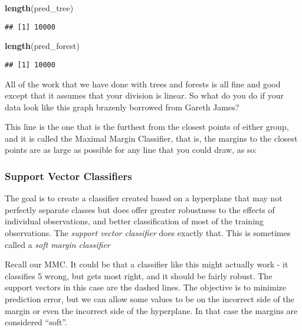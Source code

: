 \documentclass[]{article}
\newenvironment{Shaded}{\begin{snugshade}}{\end{snugshade}}
\newcommand{\KeywordTok}[1]{\textcolor[rgb]{0.13,0.29,0.53}{\textbf{#1}}}
\newcommand{\NormalTok}[1]{#1}
\begin{document}
\begin{Shaded}
\begin{Highlighting}[]
\KeywordTok{length}\NormalTok{(pred_tree)}
\end{Highlighting}
\end{Shaded}

\begin{verbatim}
## [1] 10000
\end{verbatim}

\begin{Shaded}
\begin{Highlighting}[]
\KeywordTok{length}\NormalTok{(pred_forest)}
\end{Highlighting}
\end{Shaded}

\begin{verbatim}
## [1] 10000
\end{verbatim}

All of the work that we have done with trees and forests is all fine and
good except that it assumes that your division is linear. So what do you
do if your data look like this graph brazenly borrowed from Gareth
James?

This line is the one that is the furthest from the closest points of
either group, and it is called the Maximal Margin Classifier, that is,
the margins to the closest points are as large as possible for any line
that you could draw, as so:

\subsubsection{Support Vector
Classifiers}\label{support-vector-classifiers}

The goal is to create a classifier created based on a hyperplane that
may not perfectly separate classes but does offer greater robustness to
the effects of individual observations, and better classification of
most of the training observations. The \emph{support vector classifier}
does exactly that. This is sometimes called a \emph{soft margin
classifier}

Recall our MMC. It could be that a classifier like this might actually
work - it classifies 5 wrong, but gets most right, and it should be
fairly robust. The support vectors in this case are the dashed lines.
The objective is to minimize prediction error, but we can allow some
values to be on the incorrect side of the margin or even the incorrect
side of the hyperplane. In that case the margins are considered
``soft''.
\end{document}

